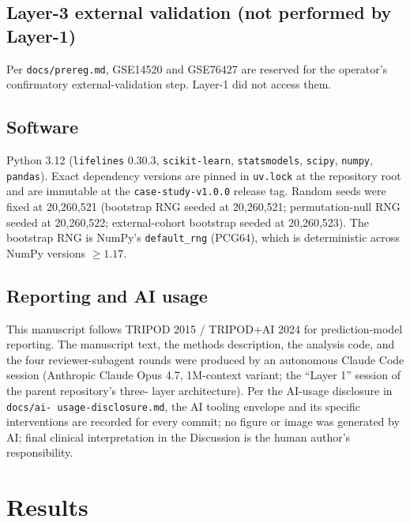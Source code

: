 \documentclass[12pt]{article}
\begin{document}
\subsection{Layer-3 external validation (not performed by Layer-1)}

Per \texttt{docs/prereg.md}, GSE14520 and GSE76427 are reserved for
the operator's confirmatory external-validation step. Layer-1 did
not access them.

\subsection{Software}

Python 3.12 (\texttt{lifelines} 0.30.3, \texttt{scikit-learn},
\texttt{statsmodels}, \texttt{scipy}, \texttt{numpy}, \texttt{pandas}).
Exact dependency versions are pinned in \texttt{uv.lock} at the
repository root and are immutable at the \texttt{case-study-v1.0.0}
release tag. Random seeds were fixed at 20{,}260{,}521 (bootstrap RNG
seeded at 20{,}260{,}521; permutation-null RNG seeded at
20{,}260{,}522; external-cohort bootstrap seeded at 20{,}260{,}523).
The bootstrap RNG is NumPy's \texttt{default\_rng} (PCG64), which is
deterministic across NumPy versions $\geq 1.17$.

\subsection{Reporting and AI usage}

This manuscript follows TRIPOD 2015\citep{collins2015tripod} /
TRIPOD+AI 2024\citep{collins2024tripodai} for prediction-model
reporting. The manuscript text, the methods description, the analysis
code, and the four reviewer-subagent rounds were produced by an
autonomous Claude Code session (Anthropic Claude Opus 4.7, 1M-context
variant; the ``Layer 1'' session of the parent repository's three-
layer architecture). Per the AI-usage disclosure in \texttt{docs/ai-
usage-disclosure.md}, the AI tooling envelope and its specific
interventions are recorded for every commit; no figure or image was
generated by AI; final clinical interpretation in the Discussion is
the human author's responsibility.

\section{Results}
\end{document}
